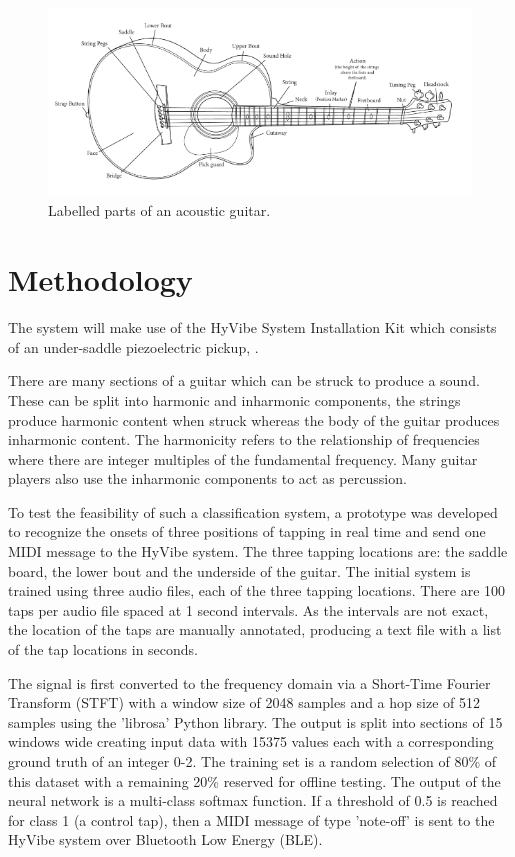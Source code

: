 \documentclass[conference]{IEEEtran}
\begin{document}
\begin{figure}[htbp]
    \centerline{\includegraphics[scale=0.4]{guitar.png}}
    \caption{Labelled parts of an acoustic guitar. \cite{b3}}
    \label{guitar}
    \end{figure}


\section{Methodology}
The system will make use of the HyVibe System Installation Kit which consists of an under-saddle piezoelectric pickup, \cite{b9}.

There are many sections of a guitar which can be struck to produce a sound. These can be split into harmonic and inharmonic components, the strings produce harmonic content when
struck whereas the body of the guitar produces inharmonic content. The harmonicity refers to the relationship of frequencies where there are integer multiples of the fundamental frequency.
Many guitar players also use the inharmonic components to act as percussion. 

To test the feasibility of such a classification system, a prototype was developed to recognize the onsets of three positions of tapping in real time and send one MIDI message to the HyVibe system.
The three tapping locations are: the saddle board, the lower bout and the underside of the guitar.
The initial system is trained using three audio files, each of the three tapping locations. There are 100 taps per audio file spaced at 1 second intervals. As the intervals are not
exact, the location of the taps are manually annotated, producing a text file with a list of the tap locations in seconds.

The signal is first converted to the frequency domain via a Short-Time Fourier Transform (STFT) with a window size of 2048 samples and a hop size of 512 samples using the 'librosa' Python library. The output is split
into sections of 15 windows wide creating input data with 15375 values each with a corresponding ground truth of an integer 0-2. The training set is a random selection of 80\% of this dataset with a remaining 20\% reserved for offline testing. 
The output of the neural network is a multi-class softmax function. If a threshold of 0.5 is reached for class 1 (a control tap), then a MIDI message of type 'note-off' is sent to the HyVibe system over 
Bluetooth Low Energy (BLE).
\end{document}
